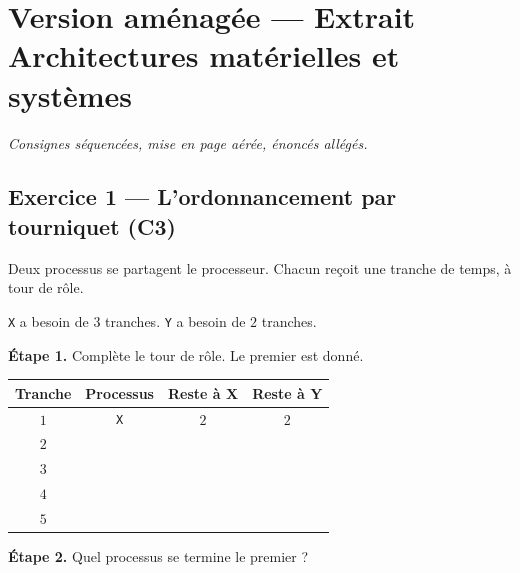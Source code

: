 \section*{Version aménagée --- Extrait Architectures matérielles et systèmes}
\textit{Consignes séquencées, mise en page aérée, énoncés allégés.}

\bigskip

\subsection*{Exercice 1 --- L'ordonnancement par tourniquet (C3)}

Deux processus se partagent le processeur. Chacun reçoit une tranche de temps,
à tour de rôle.

\medskip
\texttt{X} a besoin de $3$ tranches. \texttt{Y} a besoin de $2$ tranches.

\bigskip

\textbf{Étape 1.} Complète le tour de rôle. Le premier est donné.

\bigskip

\begin{center}
\begin{tabular}{|c|c|c|c|}
\hline
\textbf{Tranche} & \textbf{Processus} & \textbf{Reste à X} & \textbf{Reste à Y} \\
\hline
$1$ & \texttt{X} & $2$ & $2$ \\
\hline
$2$ & \dotfill & \dotfill & \dotfill \\
\hline
$3$ & \dotfill & \dotfill & \dotfill \\
\hline
$4$ & \dotfill & \dotfill & \dotfill \\
\hline
$5$ & \dotfill & \dotfill & \dotfill \\
\hline
\end{tabular}
\end{center}

\bigskip

\textbf{Étape 2.} Quel processus se termine le premier ?

\medskip
\begin{center}
 \qquad {}
\end{center}

